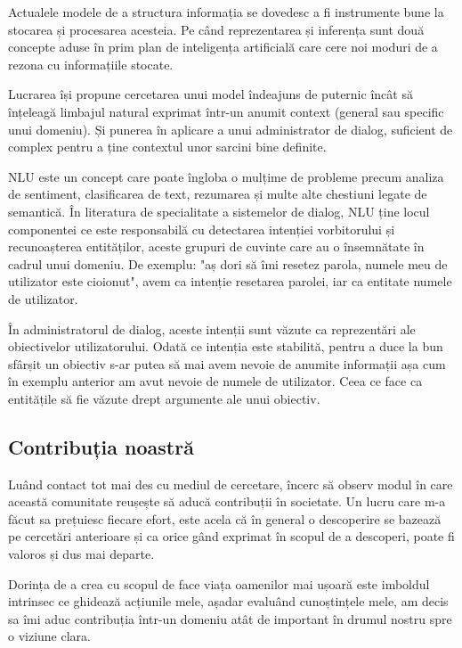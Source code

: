 Actualele modele de a structura informația se dovedesc a fi instrumente bune la stocarea și procesarea acesteia. Pe când reprezentarea și inferența sunt două concepte aduse în prim plan de inteligența artificială care cere noi moduri de a rezona cu informațiile stocate.

Lucrarea își propune cercetarea unui model îndeajuns de puternic încât să înțeleagă limbajul natural exprimat într-un anumit context (general sau specific unui domeniu). Și punerea în aplicare a unui administrator de dialog, suficient de complex pentru a ține contextul unor sarcini bine definite.

NLU este un concept care poate îngloba o mulțime de probleme precum analiza de sentiment, clasificarea de text, rezumarea și multe alte chestiuni legate de semantică. În literatura de specialitate a sistemelor de dialog, NLU ține locul componentei ce este responsabilă cu detectarea intenției vorbitorului și recunoașterea entităților, aceste grupuri de cuvinte care au o însemnătate în cadrul unui domeniu.
De exemplu: "aș dori să îmi resetez parola, numele meu de utilizator este cioionut", avem ca intenție resetarea parolei, iar ca entitate numele de utilizator.

În administratorul de dialog, aceste intenții sunt văzute ca reprezentări ale obiectivelor utilizatorului. Odată ce intenția este stabilită, pentru a duce la bun sfârșit un obiectiv s-ar putea să mai avem nevoie de anumite informații așa cum în exemplu anterior am avut nevoie de numele de utilizator. Ceea ce face ca entitățile să fie văzute drept argumente ale unui obiectiv.


\subsection{Contribuția noastră}

Luând contact tot mai des cu mediul de cercetare, încerc să observ modul în care această comunitate reușește să aducă contribuții în societate. Un lucru care m-a făcut sa prețuiesc fiecare efort, este acela că în general o descoperire se bazează pe cercetări anterioare și ca orice gând exprimat în scopul de a descoperi, poate fi valoros și dus mai departe.

Dorința de a crea cu scopul de face viața oamenilor mai ușoară este imboldul intrinsec ce ghidează acțiunile mele, așadar evaluând cunoștințele mele, am decis sa îmi aduc contribuția într-un domeniu atât de important în drumul nostru spre o viziune clara.

